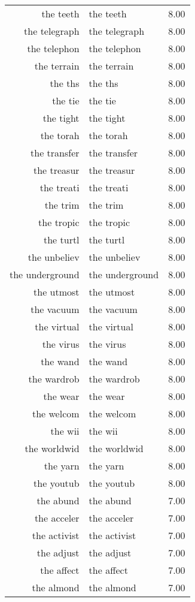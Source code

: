 \begin{table}[ht]
\begin{tabular}{rlr}
  the teeth & the teeth & 8.00 \\ 
  the telegraph & the telegraph & 8.00 \\ 
  the telephon & the telephon & 8.00 \\ 
  the terrain & the terrain & 8.00 \\ 
  the ths & the ths & 8.00 \\ 
  the tie & the tie & 8.00 \\ 
  the tight & the tight & 8.00 \\ 
  the torah & the torah & 8.00 \\ 
  the transfer & the transfer & 8.00 \\ 
  the treasur & the treasur & 8.00 \\ 
  the treati & the treati & 8.00 \\ 
  the trim & the trim & 8.00 \\ 
  the tropic & the tropic & 8.00 \\ 
  the turtl & the turtl & 8.00 \\ 
  the unbeliev & the unbeliev & 8.00 \\ 
  the underground & the underground & 8.00 \\ 
  the utmost & the utmost & 8.00 \\ 
  the vacuum & the vacuum & 8.00 \\ 
  the virtual & the virtual & 8.00 \\ 
  the virus & the virus & 8.00 \\ 
  the wand & the wand & 8.00 \\ 
  the wardrob & the wardrob & 8.00 \\ 
  the wear & the wear & 8.00 \\ 
  the welcom & the welcom & 8.00 \\ 
  the wii & the wii & 8.00 \\ 
  the worldwid & the worldwid & 8.00 \\ 
  the yarn & the yarn & 8.00 \\ 
  the youtub & the youtub & 8.00 \\ 
  the abund & the abund & 7.00 \\ 
  the acceler & the acceler & 7.00 \\ 
  the activist & the activist & 7.00 \\ 
  the adjust & the adjust & 7.00 \\ 
  the affect & the affect & 7.00 \\ 
  the almond & the almond & 7.00 \\ 

\end{tabular}
\end{table}
